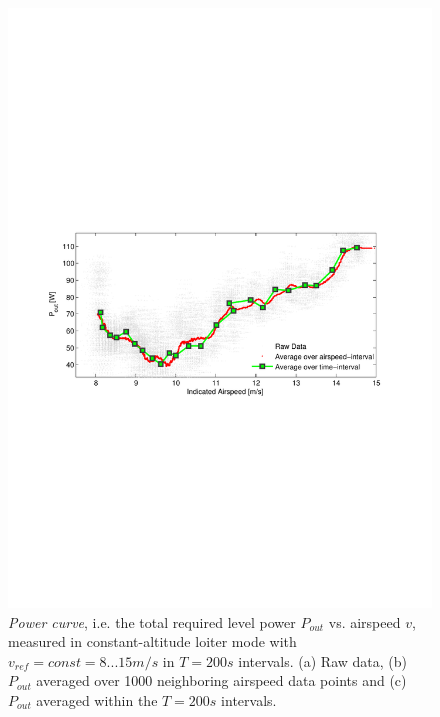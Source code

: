 \begin{figure}[tb]
    \centering
     \includegraphics[width=\linewidth]{images/PowerMeasurements/PowerMeasurements}
    \caption{\textit{Power curve}, i.e. the total required level power $P_{out}$ vs. airspeed $v$, measured in constant-altitude loiter mode with $v_{ref}=const=8...15m/s$ in $T=200s$ intervals. (a) Raw data, (b) $P_{out}$ averaged over 1000 neighboring airspeed data points and (c) $P_{out}$ averaged within the $T=200s$ intervals.} 
    \label{fig:PowerMeasurements}
\end{figure}

